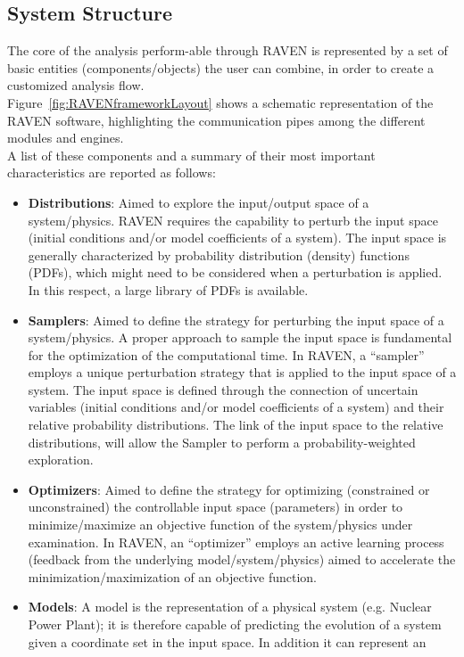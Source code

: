 \subsection{System Structure}
The core of the analysis perform-able through RAVEN is represented by a set of basic entities (components/objects) the 
user can combine, in order to create a customized analysis flow. 
\\ Figure~\ref{fig:RAVENframeworkLayout} shows a schematic representation of the RAVEN software, highlighting the communication pipes among the different modules and engines. 
\\A list of these components and a summary of their most 
important characteristics are reported as follows:
\begin{itemize}
\item	\textbf{Distributions}: Aimed to explore the input/output space of a system/physics. RAVEN requires the capability to 
perturb the input space (initial conditions and/or model coefficients of a system). The input space is generally characterized 
by probability distribution (density) functions (PDFs), which might need to be considered when a perturbation is applied. In 
this respect, a large library of PDFs is available.
\item 	\textbf{Samplers}: Aimed to define the strategy for perturbing the input space of a system/physics. A proper approach 
to sample the input space is fundamental for the optimization of the computational time. In RAVEN, a ``sampler'' employs a 
unique perturbation strategy that is applied to the input space of a system. The input space is defined through the 
connection of uncertain variables (initial conditions and/or model coefficients of a system) and their relative probability 
distributions. The link of the input space to the relative distributions, will allow the Sampler to perform a probability-weighted 
exploration.
\item 	\textbf{Optimizers}: Aimed to define the strategy for optimizing (constrained or unconstrained) the controllable input 
space (parameters) in order to 
minimize/maximize an objective function of the system/physics under examination.  In RAVEN, an ``optimizer'' employs an 
active learning process (feedback from the underlying model/system/physics) aimed to accelerate the 
minimization/maximization of an objective function.
\item 	\textbf{Models}: A model is the representation of a physical system (e.g. Nuclear Power Plant); it is therefore capable 
of predicting the evolution of a system given a coordinate set in the input space. In addition it can represent an

\end{itemize}
